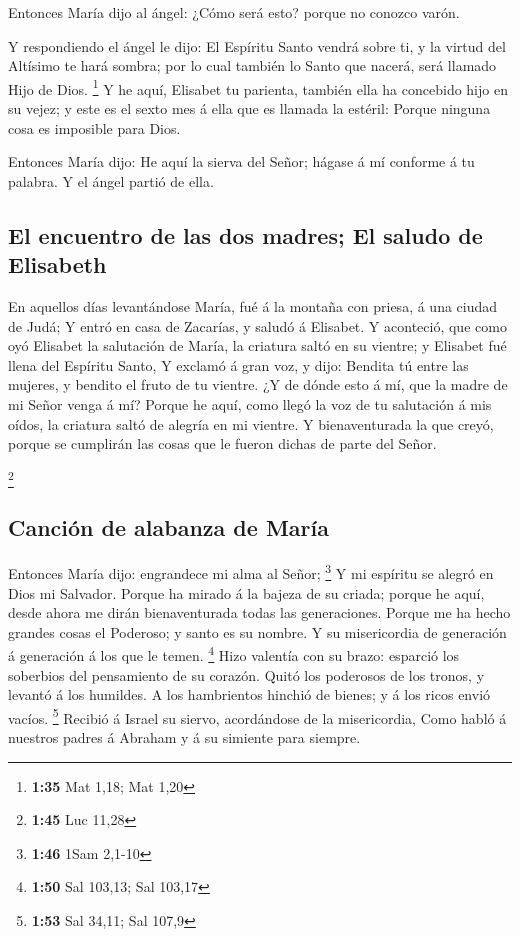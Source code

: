  Entonces María dijo al ángel: ¿Cómo será esto? porque no
conozco varón.

 Y respondiendo el ángel le dijo: El Espíritu Santo vendrá
sobre ti, y la virtud del Altísimo te hará sombra; por lo cual también
lo Santo que nacerá, será llamado Hijo de Dios. \footnote{\textbf{1:35}
  Mat 1,18; Mat 1,20}  Y he aquí, Elisabet tu parienta,
también ella ha concebido hijo en su vejez; y este es el sexto mes á
ella que es llamada la estéril:  Porque ninguna cosa es
imposible para Dios.

 Entonces María dijo: He aquí la sierva del Señor; hágase á
mí conforme á tu palabra. Y el ángel partió de ella.

\hypertarget{el-encuentro-de-las-dos-madres-el-saludo-de-elisabeth}{%
\subsection{El encuentro de las dos madres; El saludo de
Elisabeth}\label{el-encuentro-de-las-dos-madres-el-saludo-de-elisabeth}}

 En aquellos días levantándose María, fué á la montaña con
priesa, á una ciudad de Judá;  Y entró en casa de Zacarías,
y saludó á Elisabet.  Y aconteció, que como oyó Elisabet la
salutación de María, la criatura saltó en su vientre; y Elisabet fué
llena del Espíritu Santo,  Y exclamó á gran voz, y dijo:
Bendita tú entre las mujeres, y bendito el fruto de tu vientre.
 ¿Y de dónde esto á mí, que la madre de mi Señor venga á
mí?  Porque he aquí, como llegó la voz de tu salutación á
mis oídos, la criatura saltó de alegría en mi vientre.  Y
bienaventurada la que creyó, porque se cumplirán las cosas que le fueron
dichas de parte del Señor.

\footnote{\textbf{1:45} Luc 11,28}

\hypertarget{canciuxf3n-de-alabanza-de-maruxeda}{%
\subsection{Canción de alabanza de
María}\label{canciuxf3n-de-alabanza-de-maruxeda}}

 Entonces María dijo: engrandece mi alma al Señor;
\footnote{\textbf{1:46} 1Sam 2,1-10}  Y mi espíritu se
alegró en Dios mi Salvador.  Porque ha mirado á la bajeza
de su criada; porque he aquí, desde ahora me dirán bienaventurada todas
las generaciones.  Porque me ha hecho grandes cosas el
Poderoso; y santo es su nombre.  Y su misericordia de
generación á generación á los que le temen. \footnote{\textbf{1:50} Sal
  103,13; Sal 103,17}  Hizo valentía con su brazo: esparció
los soberbios del pensamiento de su corazón.  Quitó los
poderosos de los tronos, y levantó á los humildes.  A los
hambrientos hinchió de bienes; y á los ricos envió vacíos. \footnote{\textbf{1:53}
  Sal 34,11; Sal 107,9}  Recibió á Israel su siervo,
acordándose de la misericordia,  Como habló á nuestros
padres á Abraham y á su simiente para siempre.

